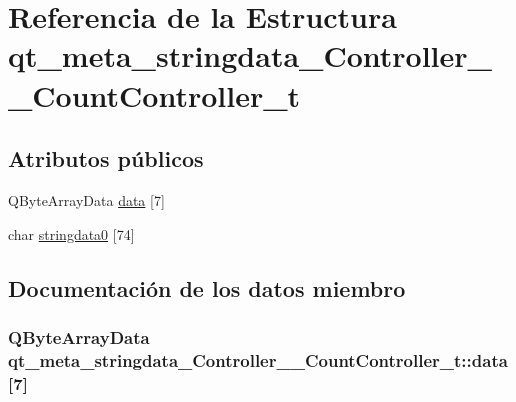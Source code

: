 \hypertarget{structqt__meta__stringdata___controller_____count_controller__t}{}\section{Referencia de la Estructura qt\+\_\+meta\+\_\+stringdata\+\_\+\+Controller\+\_\+\+\_\+\+Count\+Controller\+\_\+t}
\label{structqt__meta__stringdata___controller_____count_controller__t}
\subsection*{Atributos públicos}
\begin{DoxyCompactItemize}
\item 
Q\+Byte\+Array\+Data \hyperlink{structqt__meta__stringdata___controller_____count_controller__t_a2da01753302d68e99d96f41437e6952b}{data} \mbox{[}7\mbox{]}
\item 
char \hyperlink{structqt__meta__stringdata___controller_____count_controller__t_a5e9c416306462c2021b89c7efe00db12}{stringdata0} \mbox{[}74\mbox{]}
\end{DoxyCompactItemize}


\subsection{Documentación de los datos miembro}
\subsubsection[{\texorpdfstring{data}{data}}]{\setlength{\rightskip}{0pt plus 5cm}Q\+Byte\+Array\+Data qt\+\_\+meta\+\_\+stringdata\+\_\+\+Controller\+\_\+\+\_\+\+Count\+Controller\+\_\+t\+::data\mbox{[}7\mbox{]}}\hypertarget{structqt__meta__stringdata___controller_____count_controller__t_a2da01753302d68e99d96f41437e6952b}{}\label{structqt__meta__stringdata___controller_____count_controller__t_a2da01753302d68e99d96f41437e6952b}
